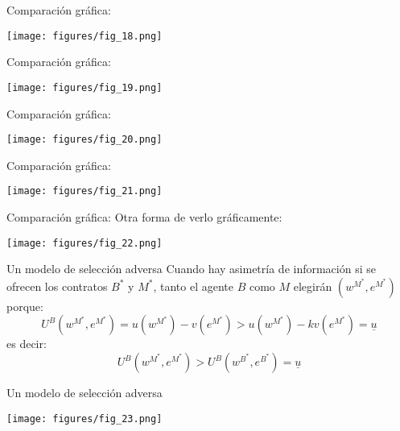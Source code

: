 \begin{frame}{Comparación gráfica:}
	\begin{center}
		\texttt{[image: figures/fig\_18.png]}
	\end{center}
\end{frame}
\begin{frame}{Comparación gráfica:}
	\begin{center}
		\texttt{[image: figures/fig\_19.png]}
	\end{center}
\end{frame}
\begin{frame}{Comparación gráfica:}
	\begin{center}
		\texttt{[image: figures/fig\_20.png]}
	\end{center}
\end{frame}
\begin{frame}{Comparación gráfica:}
	\begin{center}
		\texttt{[image: figures/fig\_21.png]}
	\end{center}
\end{frame}
\begin{frame}{Comparación gráfica:}
	Otra forma de verlo gráficamente:
	\begin{center}
		\texttt{[image: figures/fig\_22.png]}
	\end{center}
\end{frame}
\begin{frame}{Un modelo de selección adversa}
	Cuando hay asimetría de información si se ofrecen los contratos $B^*$ y $M^*$, tanto el agente $B$ como $M$ elegirán $(w^{M^\ast},e^{M^\ast})$ porque:
		$$U^B(w^{M^\ast},e^{M^\ast}) = u(w^{M^\ast}) - v(e^{M^\ast}) > u(w^{M^\ast}) - kv(e^{M^\ast}) = \underline{u}$$
	es decir:
		$$U^B(w^{M^\ast},e^{M^\ast}) > U^B(w^{B^\ast},e^{B^\ast}) = \underline{u}$$
\end{frame}
\begin{frame}{Un modelo de selección adversa}
	\begin{center}
		\texttt{[image: figures/fig\_23.png]}
	\end{center}
\end{frame}

